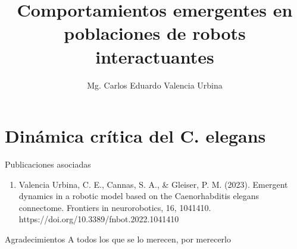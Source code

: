 \documentclass[12pt,screen,twoside,pagebackref]{ibtesis}
\title{Comportamientos emergentes en poblaciones de robots interactuantes}
\author{Mg. Carlos Eduardo Valencia Urbina}
\begin{document}

\begin{preliminary}




\tableofcontents                %

\listoffigures                  %

\listoftables                   %

\printglossary[type=\acronymtype]

\printglossary




\end{preliminary}






\part{Dinámica crítica del C. elegans}


\appendix


\begin{biblio}

\end{biblio}


\begin{postliminary}

\begin{seccion}{Publicaciones asociadas}
  \begin{enumerate}
  \item    Valencia Urbina, C. E., Cannas, S. A., \& Gleiser, P. M. (2023). Emergent dynamics in a robotic model based on the Caenorhabditis elegans connectome. Frontiers in neurorobotics, 16, 1041410. https://doi.org/10.3389/fnbot.2022.1041410
  
  \end{enumerate}
\end{seccion}

\begin{seccion}{Agradecimientos}
A todos los que se lo merecen, por merecerlo
\end{seccion}

\end{postliminary}
\end{document}
